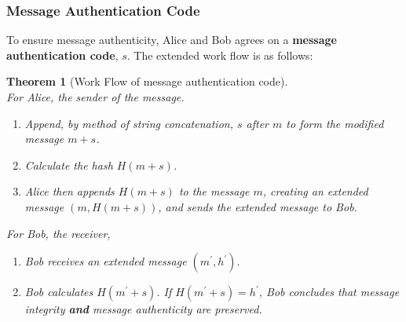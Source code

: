 \documentclass[12pt]{article}
\newtheorem{theorem}{Theorem}[section]
\theoremstyle{definition}
\begin{document}
\subsubsection{Message Authentication Code}
To ensure message authenticity, Alice and Bob agrees on a \textbf{message authentication code}, $s$. The extended work flow is as follows:
\begin{theorem}[Work Flow of message authentication code]
\hfill\\\normalfont For Alice, the sender of the message.
\begin{enumerate}
  \item Append, by method of string concatenation, $s$ after $m$ to form the modified message $m+s$.
  \item Calculate the hash $H(m+s)$.
  \item Alice then appends $H(m+s)$ to the message $m$, creating an extended message $(m, H(m+s))$, and sends the extended message to Bob.
\end{enumerate}
For Bob, the receiver,
\begin{enumerate}
  \item Bob receives an extended message $(m^\prime, h^\prime)$.
  \item Bob calculates $H(m^\prime+s)$. If $H(m^\prime+s)=h^\prime$, Bob concludes that message integrity \textbf{and} message authenticity are preserved.
\end{enumerate}
\end{theorem}
\end{document}
